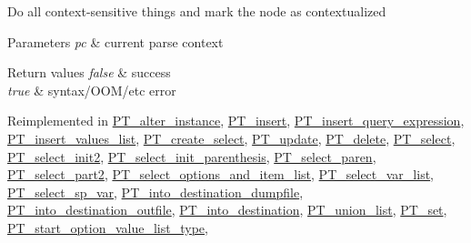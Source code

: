 Do all context-\/sensitive things and mark the node as contextualized


\begin{DoxyParams}{Parameters}
{\em pc} & current parse context\\
\hline
\end{DoxyParams}

\begin{DoxyRetVals}{Return values}
{\em false} & success \\
\hline
{\em true} & syntax/\+O\+O\+M/etc error \\
\hline
\end{DoxyRetVals}


Reimplemented in \mbox{\hyperlink{classPT__alter__instance_a802bf9ac570878d8e0ea64a315cf6b95}{P\+T\+\_\+alter\+\_\+instance}}, \mbox{\hyperlink{classPT__insert_abac83e416618613080e64190c331ccc9}{P\+T\+\_\+insert}}, \mbox{\hyperlink{classPT__insert__query__expression_ab708c488b1d12ff1a12470feaf5093b8}{P\+T\+\_\+insert\+\_\+query\+\_\+expression}}, \mbox{\hyperlink{classPT__insert__values__list_ab71ca9567e43cd73f7b4cc4782607217}{P\+T\+\_\+insert\+\_\+values\+\_\+list}}, \mbox{\hyperlink{classPT__create__select_a1caf6147549443ad1d6578da94bd131f}{P\+T\+\_\+create\+\_\+select}}, \mbox{\hyperlink{classPT__update_a899ec562dc237115c862feb157f75d8e}{P\+T\+\_\+update}}, \mbox{\hyperlink{classPT__delete_af4282b73da9ec50c66c814422e7deb06}{P\+T\+\_\+delete}}, \mbox{\hyperlink{classPT__select_aefab2397c1ee19c99d8229e8e43e115d}{P\+T\+\_\+select}}, \mbox{\hyperlink{classPT__select__init2_a9ec1334ca637b72c228fc8b87d8aef3a}{P\+T\+\_\+select\+\_\+init2}}, \mbox{\hyperlink{classPT__select__init__parenthesis_a29cc782cc10cdfb31f72074c827c043e}{P\+T\+\_\+select\+\_\+init\+\_\+parenthesis}}, \mbox{\hyperlink{classPT__select__paren_a0f3014ee99f77845cf8b686bfcaadeed}{P\+T\+\_\+select\+\_\+paren}}, \mbox{\hyperlink{classPT__select__part2_aa5b6953b68fed0bc91a7d626db111f78}{P\+T\+\_\+select\+\_\+part2}}, \mbox{\hyperlink{classPT__select__options__and__item__list_a32783a2dca4321880f0470e4b3517b63}{P\+T\+\_\+select\+\_\+options\+\_\+and\+\_\+item\+\_\+list}}, \mbox{\hyperlink{classPT__select__var__list_a5b792bf23c127377a3ff4fc30c298fcd}{P\+T\+\_\+select\+\_\+var\+\_\+list}}, \mbox{\hyperlink{classPT__select__sp__var_ab4e2e87225264b63c7f099ca221a8e01}{P\+T\+\_\+select\+\_\+sp\+\_\+var}}, \mbox{\hyperlink{classPT__into__destination__dumpfile_ab3870bce818779ff992c7025bad8d13d}{P\+T\+\_\+into\+\_\+destination\+\_\+dumpfile}}, \mbox{\hyperlink{classPT__into__destination__outfile_a6cd3dd75a5259d8f8d5a838e8dac586e}{P\+T\+\_\+into\+\_\+destination\+\_\+outfile}}, \mbox{\hyperlink{classPT__into__destination_aa713703e7bae0b070f8a05bcfc0a71a3}{P\+T\+\_\+into\+\_\+destination}}, \mbox{\hyperlink{classPT__union__list_a9e569e01264b044adc28fb8ab68bed44}{P\+T\+\_\+union\+\_\+list}}, \mbox{\hyperlink{classPT__set_afe467df4c229a07e6264c3547d5b7c36}{P\+T\+\_\+set}}, \mbox{\hyperlink{classPT__start__option__value__list__type_abc8d6e7b1c8a8ccac6006ff6b6df3f49}{P\+T\+\_\+start\+\_\+option\+\_\+value\+\_\+list\+\_\+type}}, 